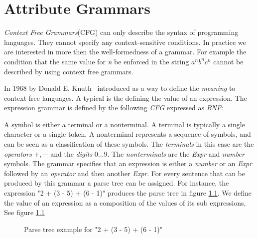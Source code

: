 \chapter{Attribute Grammars}
\label{AG}
\emph{Context Free Grammars}(CFG) can only describe the syntax of programming languages\cite{knuth1}. They cannot specify any context-sensitive conditions. In practice we are interested in more then the well-formedness of a grammar. For example the condition that the same value for \emph{n} be enforced in the string $a^nb^nc^n$ cannot be described by using context free grammars\cite{ken}.

In 1968 by Donald E. Knuth~\cite{knuth1} introduced \ags as a way to define the \emph{meaning} to context free languages. A typical is the defining the value of an expression. The expression grammar is defined by the following \emph{CFG} expressed as \emph{BNF}:



A symbol is either a terminal or a nonterminal. A terminal is typically a single character or a single token. A nonterminal represents a sequence of symbols, and can be seen as a classification of these symbols.
The \emph{terminals} in this case are the \emph{operators} $+,-$ and the \emph{digits} $0\ldots 9$. The \emph{nonterminals} are the \emph{Expr} and \emph{number} symbols. The grammar specifies that an expression is either a \emph{number} or an \emph{Expr} followed by an \emph{operator} and then another \emph{Expr}. For every sentence that can be produced by this grammar a parse tree can be assigned. For instance, the expression "2 + (3 - 5) + (6 - 1)" produces the parse tree in figure \ref{fig.example1.parsetree}. We define the value of an expression as a composition of the values of its sub expressions, See figure \ref{fig.example1.parsetree}

\begin{figure}[H]
\centering
{}
\caption{Parse tree example for "2 + (3 - 5) + (6 - 1)"}
\label{fig.example1.parsetree}
\end{figure}

